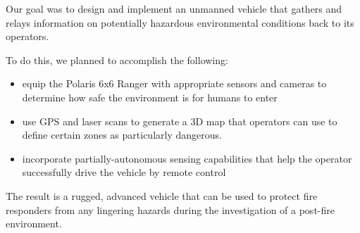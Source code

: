 Our goal was to design and implement an unmanned vehicle
that gathers and relays information on potentially 
hazardous environmental conditions back to its operators.

To do this, we planned to accomplish the following:
\begin{itemize}
	\item equip the Polaris 6x6 Ranger with appropriate sensors and cameras to determine how safe the environment is for humans to enter
	\item use GPS and laser scans to generate a 3D map that operators can use to define certain zones as particularly dangerous.
	\item incorporate partially-autonomous sensing capabilities that help the operator successfully drive the vehicle by remote control
\end{itemize} 
The result is a rugged, advanced vehicle that can be used to protect fire responders from any lingering hazards during the investigation of a post-fire environment. 

